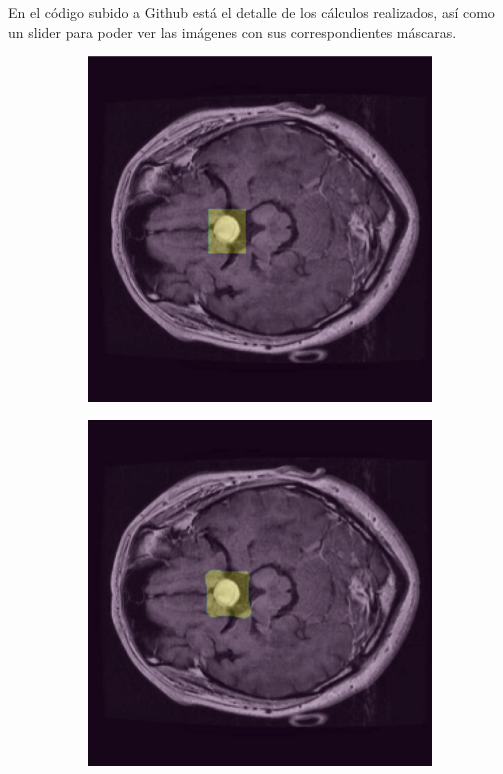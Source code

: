 En el código subido a Github está el detalle de los cálculos realizados, así como un slider para poder ver las imágenes con sus correspondientes máscaras.

\begin{figure}[H]
    \centering
    \begin{subfigure}{0.45\textwidth}
        \includegraphics[width=\linewidth]{chapters/segmentacion/images/1.png}
        \caption*{}
    \end{subfigure}
    \hfill
    \begin{subfigure}{0.45\textwidth}
        \includegraphics[width=\linewidth]{chapters/segmentacion/images/2.png}
        \caption*{}
    \end{subfigure}
    \medskip
    

\end{figure}
